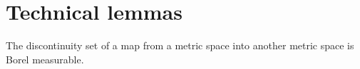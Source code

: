 

\section{Technical lemmas}
\setcounter{theorem}{0}
\setcounter{equation}{0}


\renewcommand{\theenumi}{\roman{enumi}}
\renewcommand{\labelenumi}{\textnormal{(\theenumi)}$\;\;$}


\begin{proposition}\label{DiscontinuitySetsAreBorel}\quad
The discontinuity set of a map from a metric space into another metric space is Borel measurable.
\end{proposition}


